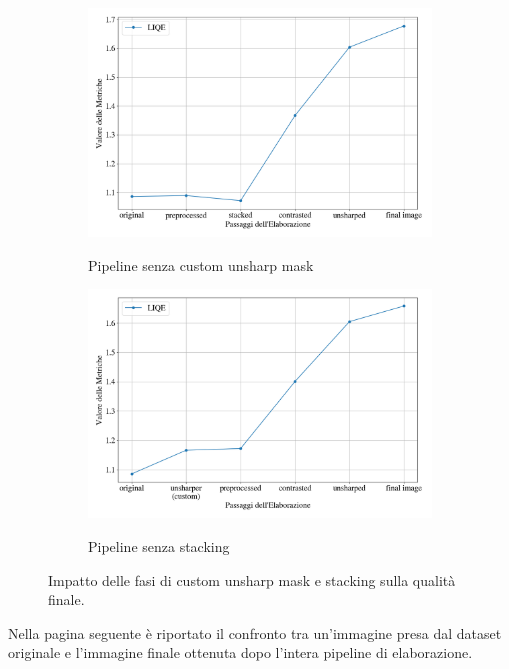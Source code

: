 \begin{figure}[H]
    \begin{subfigure}[t]{0.49\textwidth}
        \centering
        \caption{Pipeline senza custom unsharp mask}
        \includegraphics[width=\linewidth]{../assets/overall_no_ush.png}
        \label{fig:overall_no_ush}
    \end{subfigure}
    \hfill
    \begin{subfigure}[t]{0.49\textwidth}
        \centering
        \caption{Pipeline senza stacking}
        \includegraphics[width=\linewidth]{../assets/overall_no_stack.png}
        \label{fig:overall_no_stack}
    \end{subfigure}
    \caption{Impatto delle fasi di custom unsharp mask e stacking sulla qualità finale.}
    \label{fig:overall_no}
\end{figure}

Nella pagina seguente è riportato il confronto tra un'immagine presa dal dataset originale e l'immagine finale ottenuta dopo l'intera pipeline di elaborazione.

